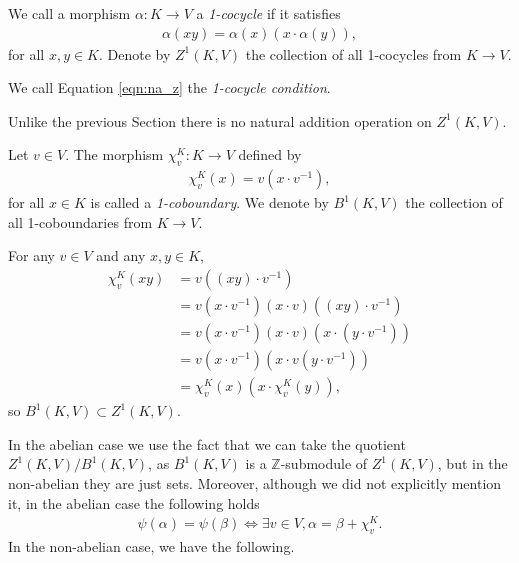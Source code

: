 \begin{definition} We call a morphism $\alpha:K\rightarrow V$ a \emph{1-cocycle} if it satisfies
\begin{align}
  \alpha(xy) = \alpha(x) (x\cdot\alpha(y)),
  \label{eqn:na_z}
\end{align}
for all $x, y \in K$. Denote by $Z^1\left( K, V \right)$ the collection of all 1-cocycles from $K\rightarrow V$.

We call Equation \ref{eqn:na_z} the \emph{1-cocycle condition}.
\end{definition}

\begin{remark} Unlike the previous Section there is no natural addition operation on $Z^1(K, V)$.
\end{remark}

\begin{definition} Let $v \in V$. The morphism $\chi^K_v:K\rightarrow V$ defined by
\begin{align*}
	\chi^K_v (x) = v (x\cdot v^{-1}),
\end{align*}
for all $x \in K$ is called a \emph{1-coboundary}. We denote by $B^1\left(K, V\right)$ the collection of all 1-coboundaries from $K \rightarrow V$.
\end{definition}

For any $v \in V$ and any $x, y \in K$,
\begin{align*}
	\chi^K_v(xy) &=  v \left((xy) \cdot v^{-1}\right) \\
	&=  v (x \cdot v^{-1}) (x \cdot v) ((xy) \cdot v^{-1}) \\
	&=  v \left(x \cdot v^{-1}\right) (x \cdot v) \left(x \cdot \left(y \cdot v^{-1}\right)\right) \\
	&=  v \left(x \cdot v^{-1}\right) \left(x \cdot v \left(y \cdot v^{-1}\right)\right) \\
	&=  \chi^K_v(x) (x \cdot \chi^K_v(y)),
\end{align*}
so $B^1(K, V) \subset Z^1(K, V)$.

In the abelian case we use the fact that we can take the quotient $Z^1(K, V)/B^1(K, V)$, as $B^1(K, V)$ is a $\mathbb{Z}$-submodule of $Z^1(K, V)$, but in the non-abelian they are just sets. Moreover, although we did not explicitly mention it, in the abelian case the following holds
\begin{align*}
	\psi(\alpha) = \psi(\beta) \Leftrightarrow \exists v \in V, \alpha = \beta + \chi^K_v.
\end{align*}
In the non-abelian case, we have the following.

